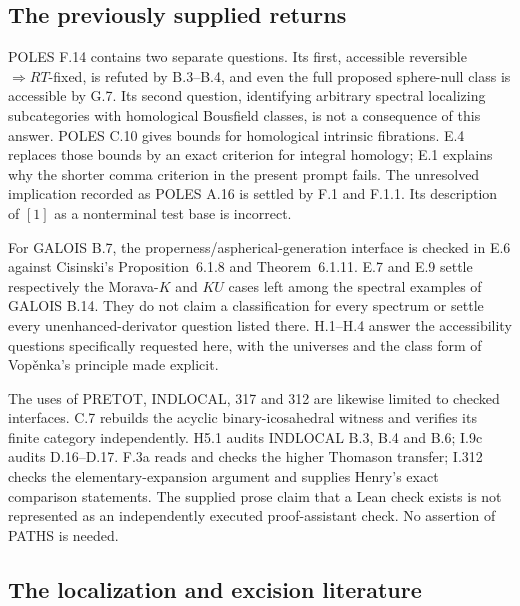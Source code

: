 \subsection{The previously supplied returns}

POLES F.14 contains two separate questions. Its first, accessible reversible
$\Rightarrow RT$-fixed, is refuted by B.3--B.4, and even the full proposed
sphere-null class is accessible by G.7. Its second question, identifying
arbitrary spectral localizing subcategories with homological Bousfield
classes, is not a consequence of this answer. POLES C.10 gives bounds for
homological intrinsic fibrations. E.4 replaces those bounds by an exact
criterion for integral homology; E.1 explains why the shorter comma criterion
in the present prompt fails. The unresolved implication recorded as POLES
A.16 is settled by F.1 and F.1.1. Its description of $[1]$ as a nonterminal
test base is incorrect.

For GALOIS B.7, the properness/aspherical-generation interface is checked in
E.6 against Cisinski's Proposition~6.1.8 and Theorem~6.1.11.
E.7 and E.9 settle respectively the Morava-$K$ and $KU$ cases left among the
spectral examples of GALOIS B.14. They do not claim a classification for
every spectrum or settle every unenhanced-derivator question listed there.
H.1--H.4 answer the accessibility questions specifically requested here,
with the universes and the class form of Vop\v enka's principle made explicit.

The uses of PRETOT, INDLOCAL, 317 and 312 are likewise limited to checked
interfaces. C.7 rebuilds the acyclic binary-icosahedral witness and verifies
its finite category independently. H5.1 audits INDLOCAL B.3, B.4 and B.6;
I.9c audits D.16--D.17. F.3a reads and checks the higher Thomason transfer;
I.312 checks the elementary-expansion argument and supplies Henry's exact
comparison statements. The supplied prose claim that a Lean check exists
is not represented as an independently executed proof-assistant check.
No assertion of PATHS is needed.

\subsection{The localization and excision literature}

